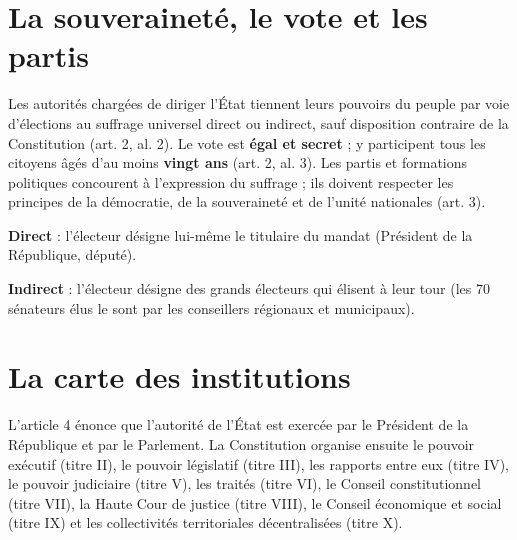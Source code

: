 \documentclass[11pt,a4paper,oneside]{report}
\begin{document}
\section{La souveraineté, le vote et les partis}
Les autorités chargées de diriger l'État tiennent leurs pouvoirs du peuple par voie d'élections au suffrage universel direct ou indirect, sauf disposition contraire de la Constitution (art. 2, al. 2). Le vote est \textbf{égal et secret} ; y participent tous les citoyens âgés d'au moins \textbf{vingt ans} (art. 2, al. 3). Les partis et formations politiques concourent à l'expression du suffrage ; ils doivent respecter les principes de la démocratie, de la souveraineté et de l'unité nationales (art. 3).

\begin{defbox}[title={Définition — Suffrage direct et suffrage indirect}]
\textbf{Direct} : l'électeur désigne lui-même le titulaire du mandat (Président de la République, député).

\textbf{Indirect} : l'électeur désigne des grands électeurs qui élisent à leur tour (les 70 sénateurs élus le sont par les conseillers régionaux et municipaux).
\end{defbox}
\section{La carte des institutions}
L'article 4 énonce que l'autorité de l'État est exercée par le Président de la République et par le Parlement. La Constitution organise ensuite le pouvoir exécutif (titre II), le pouvoir législatif (titre III), les rapports entre eux (titre IV), le pouvoir judiciaire (titre V), les traités (titre VI), le Conseil constitutionnel (titre VII), la Haute Cour de justice (titre VIII), le Conseil économique et social (titre IX) et les collectivités territoriales décentralisées (titre X).
\end{document}
